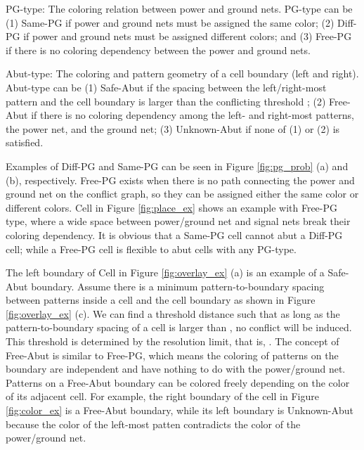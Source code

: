 \begin{mydefinition}
PG-type: The coloring relation between power and ground nets. PG-type can be (1) Same-PG if power and ground nets must be assigned the same color; (2) Diff-PG if power and ground nets must be assigned different colors; and (3) Free-PG if there is no coloring dependency between the power and ground nets.
\end{mydefinition}

\begin{mydefinition}
Abut-type: The coloring and pattern geometry of a cell boundary (left and right). Abut-type can be (1) Safe-Abut if the spacing between the left/right-most pattern and the cell boundary is larger than the conflicting threshold ; (2) Free-Abut if there is no coloring dependency among the left- and right-most patterns, the power net, and the ground net; (3) Unknown-Abut if none of (1) or (2) is satisfied.
\end{mydefinition}

Examples of Diff-PG and Same-PG can be seen in Figure \ref{fig:pg_prob} (a) and (b), respectively. Free-PG exists when there is no path connecting the power and ground net on the conflict graph, so they can be assigned either the same color or different colors. Cell  in Figure \ref{fig:place_ex} shows an example with Free-PG type, where a wide space between power/ground net and signal nets break their coloring dependency. It is obvious that a Same-PG cell cannot abut a Diff-PG cell; while a Free-PG cell is flexible to abut cells with any PG-type.

The left boundary of Cell  in Figure \ref{fig:overlay_ex} (a) is an example of a Safe-Abut boundary. Assume there is a minimum pattern-to-boundary spacing  between patterns inside a cell and the cell boundary as shown in Figure \ref{fig:overlay_ex} (c). We can find a threshold distance  such that as long as the pattern-to-boundary spacing  of a cell is larger than , no conflict will be induced. This threshold is determined by the resolution limit, that is, . The concept of Free-Abut is similar to Free-PG, which means the coloring of patterns on the boundary are independent and have nothing to do with the power/ground net. Patterns on a Free-Abut boundary can be colored freely depending on the color of its adjacent cell. For example, the right boundary of the cell in Figure \ref{fig:color_ex} is a Free-Abut boundary, while its left boundary is Unknown-Abut because the color of the left-most patten contradicts the color of the power/ground net.

